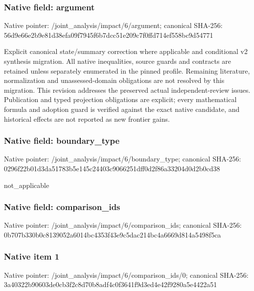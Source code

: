 \documentclass[10pt,a4paper]{article}
\begin{document}
\subsubsection{Native field: argument}
Native pointer: /joint\_\allowbreak{}analysis/impact/6/argument; canonical SHA-256: 56d9e66e2b9e81d38efa09f7945f6b7dcc51e209c7f0ffd714ef558bc9d54771

\begingroup\raggedright\sloppy Explicit canonical state/\allowbreak{}summary correction where applicable and conditional v2 synthesis migration. All native inequalities,\allowbreak{} source guards and contracts are retained unless separately enumerated in the pinned profile. Remaining literature,\allowbreak{} normalization and unassessed-domain obligations are not resolved by this migration. This revision addresses the preserved actual independent-review issues. Publication and typed projection obligations are explicit;\allowbreak{} every mathematical formula and adoption guard is verified against the exact native candidate,\allowbreak{} and historical effects are not reported as new frontier gains.\par\endgroup

\subsubsection{Native field: boundary\_\allowbreak{}type}
Native pointer: /joint\_\allowbreak{}analysis/impact/6/boundary\_\allowbreak{}type; canonical SHA-256: 0296f22b01d3da51783b5e145c24403c9066251dff0d2f86a33204d0d2b0cd38

\begingroup\raggedright\sloppy not\_\allowbreak{}applicable\par\endgroup

\subsubsection{Native field: comparison\_\allowbreak{}ids}
Native pointer: /joint\_\allowbreak{}analysis/impact/6/comparison\_\allowbreak{}ids; canonical SHA-256: 0b707b330b0c8139052a6014bc4353f43e9c5dac214bc4a6669d814a5498f5ca

\subsubsection{Native item 1}
Native pointer: /joint\_\allowbreak{}analysis/impact/6/comparison\_\allowbreak{}ids/0; canonical SHA-256: 3a40322b90603de0cb3f2c8d70b8adf4c0f3641f9d3ed4e42f9280a5e4422a51
\end{document}
